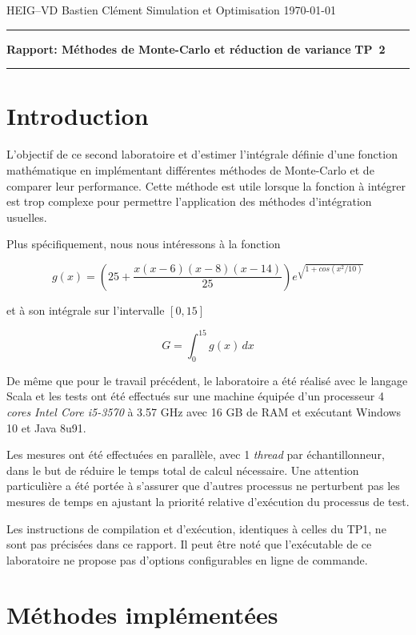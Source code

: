 \documentclass[a4paper,11pt]{article}
\begin{document}
	
{\sc HEIG--VD} \hfill Bastien Clément\newline 
Simulation et Optimisation \hfill \today \newline
\hrule
\vspace{2mm}
{\large \bf Rapport: Méthodes de Monte-Carlo et réduction de variance} \hfill {\large \bf TP~2}
\vspace{4mm}
\hrule

\tableofcontents

\section{Introduction}

L'objectif de ce second laboratoire et d'estimer l'intégrale définie d'une fonction mathématique en implémentant différentes méthodes de Monte-Carlo et de comparer leur performance. Cette méthode est utile lorsque la fonction à intégrer est trop complexe pour permettre l'application des méthodes d'intégration usuelles.

Plus spécifiquement, nous nous intéressons à la fonction

\[
	g(x) = \left( 25 + \frac{x(x-6)(x-8)(x-14)}{25} \right) e^{\sqrt{1+cos(x^2/10)}}
\]

et à son intégrale sur l'intervalle $[0,15]$

\[
	G = \int_{0}^{15} g(x) \,dx
\]

De même que pour le travail précédent, le laboratoire a été réalisé avec le langage Scala et les tests ont été effectués sur une machine équipée d'un processeur 4 \emph{cores} \emph{Intel Core i5-3570} à 3.57 GHz avec 16 GB de RAM et exécutant Windows 10 et Java 8u91.

Les mesures ont été effectuées en parallèle, avec 1 \emph{thread} par échantillonneur, dans le but de réduire le temps total de calcul nécessaire. Une attention particulière a été portée à s'assurer que d'autres processus ne perturbent pas les mesures de temps en ajustant la priorité relative d'exécution du processus de test.

Les instructions de compilation et d'exécution, identiques à celles du TP1, ne sont pas précisées dans ce rapport. Il peut être noté que l'exécutable de ce laboratoire ne propose pas d'options configurables en ligne de commande.

\section{Méthodes implémentées}
\end{document}
